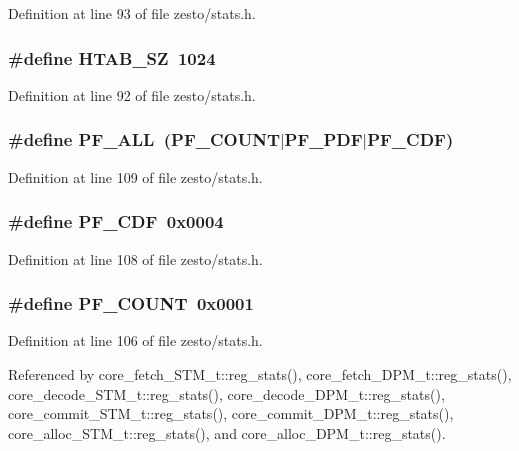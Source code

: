 Definition at line 93 of file zesto/stats.h.
\subsubsection[{HTAB\_\-SZ}]{\setlength{\rightskip}{0pt plus 5cm}\#define HTAB\_\-SZ~1024}\label{zesto_2stats_8h_a9de58549ac3f9cc4c23ce618b91b53f}




Definition at line 92 of file zesto/stats.h.
\subsubsection[{PF\_\-ALL}]{\setlength{\rightskip}{0pt plus 5cm}\#define PF\_\-ALL~(PF\_\-COUNT$|$PF\_\-PDF$|$PF\_\-CDF)}\label{zesto_2stats_8h_3ea4fdaa5e25d50a550571bb829f709c}




Definition at line 109 of file zesto/stats.h.
\subsubsection[{PF\_\-CDF}]{\setlength{\rightskip}{0pt plus 5cm}\#define PF\_\-CDF~0x0004}\label{zesto_2stats_8h_0cf410069cb11a44448cea46cf11c047}




Definition at line 108 of file zesto/stats.h.
\subsubsection[{PF\_\-COUNT}]{\setlength{\rightskip}{0pt plus 5cm}\#define PF\_\-COUNT~0x0001}\label{zesto_2stats_8h_a2ea8c2ebd4b70b8bb60561c6fada674}




Definition at line 106 of file zesto/stats.h.

Referenced by core\_\-fetch\_\-STM\_\-t::reg\_\-stats(), core\_\-fetch\_\-DPM\_\-t::reg\_\-stats(), core\_\-decode\_\-STM\_\-t::reg\_\-stats(), core\_\-decode\_\-DPM\_\-t::reg\_\-stats(), core\_\-commit\_\-STM\_\-t::reg\_\-stats(), core\_\-commit\_\-DPM\_\-t::reg\_\-stats(), core\_\-alloc\_\-STM\_\-t::reg\_\-stats(), and core\_\-alloc\_\-DPM\_\-t::reg\_\-stats().
